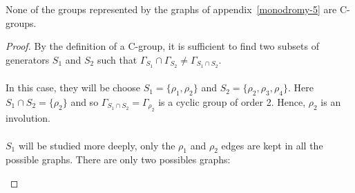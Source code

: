 \begin{theorem}
  None of the groups represented by the graphs of appendix~\ref{monodromy-5} are C-groups.
\end{theorem}

\begin{proof}
  By the definition of a C-group, it is sufficient to find two subsets of generators $S_1$ and $S_2$ such that $\Gamma_{S_1} \cap \Gamma_{S_2} \neq \Gamma_{S_1 \cap S_2}$.

  \paragraph{}
  In this case, they will be choose $S_1 = \{\rho_1, \rho_2\}$ and $S_2 = \{\rho_2, \rho_3, \rho_4\}$. Here $S_1 \cap S_2 = \{\rho_2\}$ and so $\Gamma_{S_1 \cap S_2} = \Gamma_{\rho_2}$ is a cyclic group of order 2. Hence, $\rho_2$ is an involution.

  \paragraph{}
  $S_1$ will be studied more deeply, only the $\rho_1$ and $\rho_2$ edges are kept in all the possible graphs. There are only two possibles graphs:

  \begin{figure}[H]
    \begin{center}
\end{center}
\end{figure}
\end{proof}
